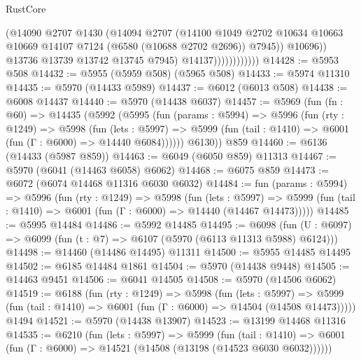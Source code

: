 \begin{lexlean}{RustCore}
\begin{coremodule}
                                (@14090
                                  @2707
                                  @1430
                                  (@14094
                                    @2707
                                    (@14100
                                      @1049
                                      @2702
                                      @10634
                                      @10663
                                      @10669
                                      @14107
                                      @7124
                                      (@6580 (@10688 @2702 @2696))
                                      @7945))
                                  @10696))
                              @13736
                              @13739
                              @13742
                              @13745
                              @7945)
                            @14137))))))))))))
@14428 := @5953 @508
@14432 := @5955 (@5959 @508) (@5965 @508)
@14433 := @5974 @11310
@14435 := @5970 (@14433 @5989)
@14437 := @6012 (@6013 @508)
@14438 := @6008 @14437
@14440 := @5970 (@14438 @6037)
@14457 := @5969
    (fun (fn : @60) =>
    @14435
      (@5992
        (@5995
          (fun (params : @5994) =>
          @5996
            (fun (rty : @1249) =>
            @5998
              (fun (lets : @5997) =>
              @5999 (fun (tail : @1410) => @6001 (fun (Γ : @6000) => @14440 @6084))))))
        @6130))
    @859
@14460 := @6136 (@14433 (@5987 @859))
@14463 := @6049 (@6050 @859) @11313
@14467 := @5970 (@6041 (@14463 @6058) @6062)
@14468 := @6075 @859
@14473 := @6072 (@6074 @14468 @11316 @6030 @6032)
@14484 := fun (params : @5994) =>
  @5996
    (fun (rty : @1249) =>
    @5998
      (fun (lets : @5997) =>
      @5999 (fun (tail : @1410) => @6001 (fun (Γ : @6000) => @14440 (@14467 @14473)))))
@14485 := @5995 @14484
@14486 := @5992 @14485
@14495 := @6098
    (fun (U : @6097) => @6099 (fun (t : @7) => @6107 (@5970 (@6113 @11313 @5988) @6124)))
@14498 := @14460 (@14486 @14495) @11311
@14500 := @5955 @14485 @14495
@14502 := @6185 @14484 @1861
@14504 := @5970 (@14438 @9448)
@14505 := @14463 @9451
@14506 := @6041 @14505
@14508 := @5970 (@14506 @6062)
@14519 := @6188
    (fun (rty : @1249) =>
    @5998
      (fun (lets : @5997) =>
      @5999 (fun (tail : @1410) => @6001 (fun (Γ : @6000) => @14504 (@14508 @14473)))))
    @1494
@14521 := @5970 (@14438 @13907)
@14523 := @13199 @14468 @11316
@14535 := @6210
    (fun (lets : @5997) =>
    @5999
      (fun (tail : @1410) =>
      @6001 (fun (Γ : @6000) => @14521 (@14508 (@13198 (@14523 @6030 @6032))))))

\end{coremodule}
\end{lexlean}
